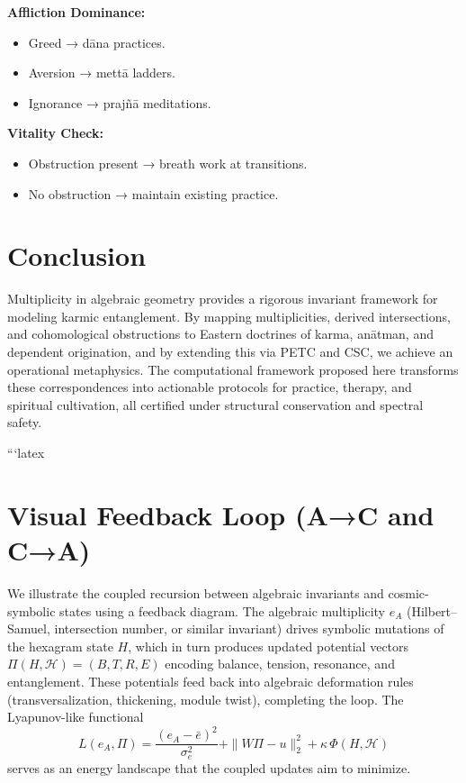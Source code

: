 \documentclass[12pt]{article}
\begin{document}
\textbf{Affliction Dominance:}
\begin{itemize}
  \item Greed → dāna practices.
  \item Aversion → mettā ladders.
  \item Ignorance → prajñā meditations.
\end{itemize}

\textbf{Vitality Check:}
\begin{itemize}
  \item Obstruction present → breath work at transitions.
  \item No obstruction → maintain existing practice.
\end{itemize}

\section{Conclusion}
Multiplicity in algebraic geometry provides a rigorous invariant framework for modeling karmic entanglement. By mapping multiplicities, derived intersections, and cohomological obstructions to Eastern doctrines of karma, anātman, and dependent origination, and by extending this via PETC and CSC, we achieve an operational metaphysics. The computational framework proposed here transforms these correspondences into actionable protocols for practice, therapy, and spiritual cultivation, all certified under structural conservation and spectral safety.

```latex
\appendix

\section{Visual Feedback Loop (A→C and C→A)}

We illustrate the coupled recursion between algebraic invariants and cosmic-symbolic states using a feedback diagram. The algebraic multiplicity $e_A$ (Hilbert–Samuel, intersection number, or similar invariant) drives symbolic mutations of the hexagram state $H$, which in turn produces updated potential vectors $\Pi(H,\mathcal{H})=(B,T,R,E)$ encoding balance, tension, resonance, and entanglement. These potentials feed back into algebraic deformation rules (transversalization, thickening, module twist), completing the loop. The Lyapunov-like functional
\[
L(e_A,\Pi) = \frac{(e_A-\bar e)^2}{\sigma_e^2} + \|W\Pi-u\|_2^2 + \kappa\,\Phi(H,\mathcal{H})
\]
serves as an energy landscape that the coupled updates aim to minimize.
\end{document}
